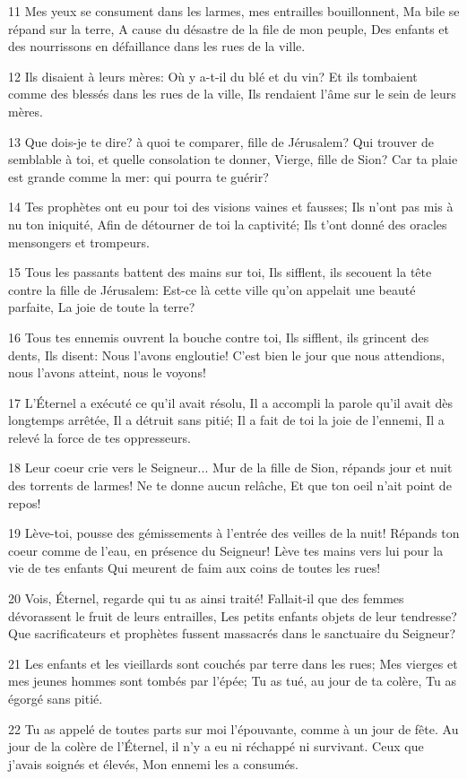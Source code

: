 \par 11 Mes yeux se consument dans les larmes, mes entrailles bouillonnent, Ma bile se répand sur la terre, A cause du désastre de la file de mon peuple, Des enfants et des nourrissons en défaillance dans les rues de la ville.
\par 12 Ils disaient à leurs mères: Où y a-t-il du blé et du vin? Et ils tombaient comme des blessés dans les rues de la ville, Ils rendaient l'âme sur le sein de leurs mères.
\par 13 Que dois-je te dire? à quoi te comparer, fille de Jérusalem? Qui trouver de semblable à toi, et quelle consolation te donner, Vierge, fille de Sion? Car ta plaie est grande comme la mer: qui pourra te guérir?
\par 14 Tes prophètes ont eu pour toi des visions vaines et fausses; Ils n'ont pas mis à nu ton iniquité, Afin de détourner de toi la captivité; Ils t'ont donné des oracles mensongers et trompeurs.
\par 15 Tous les passants battent des mains sur toi, Ils sifflent, ils secouent la tête contre la fille de Jérusalem: Est-ce là cette ville qu'on appelait une beauté parfaite, La joie de toute la terre?
\par 16 Tous tes ennemis ouvrent la bouche contre toi, Ils sifflent, ils grincent des dents, Ils disent: Nous l'avons engloutie! C'est bien le jour que nous attendions, nous l'avons atteint, nous le voyons!
\par 17 L'Éternel a exécuté ce qu'il avait résolu, Il a accompli la parole qu'il avait dès longtemps arrêtée, Il a détruit sans pitié; Il a fait de toi la joie de l'ennemi, Il a relevé la force de tes oppresseurs.
\par 18 Leur coeur crie vers le Seigneur... Mur de la fille de Sion, répands jour et nuit des torrents de larmes! Ne te donne aucun relâche, Et que ton oeil n'ait point de repos!
\par 19 Lève-toi, pousse des gémissements à l'entrée des veilles de la nuit! Répands ton coeur comme de l'eau, en présence du Seigneur! Lève tes mains vers lui pour la vie de tes enfants Qui meurent de faim aux coins de toutes les rues!
\par 20 Vois, Éternel, regarde qui tu as ainsi traité! Fallait-il que des femmes dévorassent le fruit de leurs entrailles, Les petits enfants objets de leur tendresse? Que sacrificateurs et prophètes fussent massacrés dans le sanctuaire du Seigneur?
\par 21 Les enfants et les vieillards sont couchés par terre dans les rues; Mes vierges et mes jeunes hommes sont tombés par l'épée; Tu as tué, au jour de ta colère, Tu as égorgé sans pitié.
\par 22 Tu as appelé de toutes parts sur moi l'épouvante, comme à un jour de fête. Au jour de la colère de l'Éternel, il n'y a eu ni réchappé ni survivant. Ceux que j'avais soignés et élevés, Mon ennemi les a consumés.

